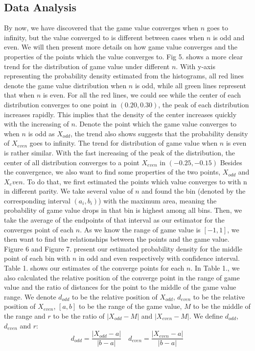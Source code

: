 \documentclass{article}
\begin{document}
\begin{spacing}{1.4}
\subsection{Data Analysis}
By now, we have discovered that the game value converges when $n$ goes to infinity, but the value converged to is different between cases when $n$ is odd and even. We will then present more details on how game value converges and the properties of the points which the value converges to.\newline
Fig 5. shows a more clear trend for the distribution of game value under different $n$. With y-axis representing the probability density estimated from the histograms, all red lines denote the game value distribution when $n$ is odd, while all green lines represent that when $n$ is even. For all the red lines, we could see while the center of each distribution converges to one point in $(0.20,0.30)$, the peak of each distribution increases rapidly. This implies that the density of the center increases quickly with the increasing of $n$. Denote the point which the game value converges to when $n$ is odd as $X_{odd}$, the trend also shows suggests that the probability density of $X_{even}$ goes to infinity. The trend for distribution of game value when $n$ is even is rather similar. With the fast increasing of the peak of the distribution, the center of all distribution converges to a point $X_{even}$ in $(-0.25, -0.15)$\newline
Besides the convergence, we also want to find some properties of the two points, $X_{odd}$ and $X_even$. To do that, we first estimated the points which value converges to with n in different parity. We take several value of $n$ and found the bin (denoted by the corresponding interval $(a_i, b_i)$) with the maximum area, meaning the probability of game value drops in that bin is highest among all bins. Then, we take the average of the endpoints of that interval as our estimator for the converges point of each $n$. As we know the range of game value is $[-1,1]$, we then want to find the relationships between the points and the game value. Figure 6 and Figure 7. present our estimated probability density for the middle point of each bin with $n$ in odd and even respectively with confidence interval. Table 1. shows our estimates of the converge points for each $n$. In Table 1., we also calculated the relative position of the converge point in the range of game value and the ratio of distances for the point to the middle of the game value range. We denote $d_{odd}$ to be the relative position of $X_{odd}$, $d_{even}$ to be the relative position of $X_{even}$, $[a,b]$ to be the range of the game value, $M$ to be the middle of the range and $r$ to be the ratio of $|X_{odd}-M|$ and $|X_{even}-M|$. We define $d_{odd}$, $d_{even}$ and $r$:
\begin{equation*}
    d_{odd}=\frac{|X_{odd}-a|}{|b-a|} \quad d_{even}=\frac{|X_{even}-a|}{|b-a|}
\end{equation*}


\end{spacing}
\end{document}

